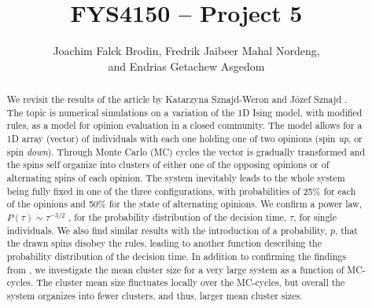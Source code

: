 \documentclass[a4paper]{article}
\begin{document}
\title{FYS4150 -- Project 5}
\author{Joachim Falck Brodin,
        Fredrik Jaibeer Mahal Nordeng,\\ 
        and Endrias Getachew Asgedom}

\maketitle
\begin{abstract}
We revisit the results of the article by Katarzyna Sznajd-Weron and Józef Sznajd \cite{opinion}. The topic is numerical simulations on a variation of the 1D Ising model, with modified rules, as a model for opinion evaluation in a closed community. The model allows for a 1D array (vector) of individuals with each one holding one of two opinions (spin \textit{up}, or spin \textit{down}). Through Monte Carlo (MC) cycles the vector is gradually transformed and the spins self organize into clusters of either one of the opposing opinions or of alternating spins of each opinion. The system inevitably leads to the whole system being fully fixed in one of the three configurations, with probabilities of 25\% for each of the opinions and 50\% for the state of alternating opinions. We confirm a power law, $P(\tau)\sim \tau^{-3/2}$ , for the probability distribution of the decision time, $\tau$, for single individuals. We also find similar results with the introduction of a probability, $p$, that the drawn spins disobey the rules, leading to another function describing the probability distribution of the decision time. In addition to confirming the findings from \cite{opinion}, we investigate the mean cluster size for a very large system as a function of MC-cycles. The cluster mean size fluctuates locally over the MC-cycles, but overall the system organizes into fewer clusters, and thus, larger mean cluster sizes.






\noindent




\end{abstract}
\end{document}
